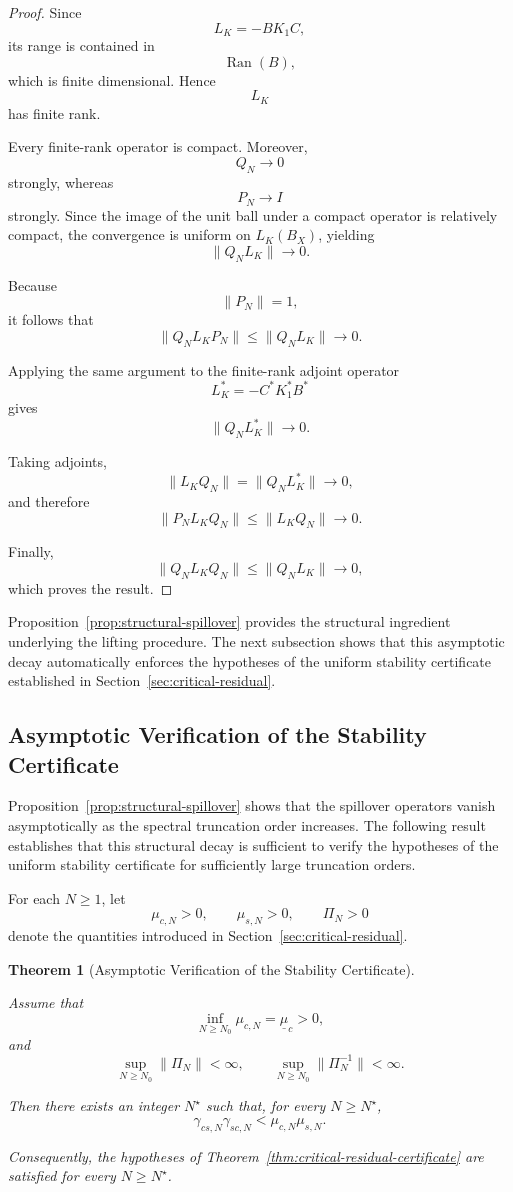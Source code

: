 \documentclass[pdflatex,sn-mathphys-num]{sn-jnl}
\theoremstyle{thmstyleone}%
\newtheorem{theorem}{Theorem}%
\theoremstyle{thmstyletwo}%
\theoremstyle{thmstylethree}%
\begin{document}
\begin{proof}

Since
\[
L_K=-BK_1C,
\]
its range is contained in
\[
\operatorname{Ran}(B),
\]
which is finite dimensional. Hence
\[
L_K
\]
has finite rank.

Every finite-rank operator is compact. Moreover,
\[
Q_N\rightarrow0
\]
strongly, whereas
\[
P_N\rightarrow I
\]
strongly. Since the image of the unit ball under a compact operator is relatively compact, the convergence is uniform on \(L_K(B_X)\), yielding
\[
\|Q_NL_K\|
\longrightarrow0.
\]

Because
\[
\|P_N\|=1,
\]
it follows that
\[
\|Q_NL_KP_N\|
\le
\|Q_NL_K\|
\longrightarrow0.
\]

Applying the same argument to the finite-rank adjoint operator
\[
L_K^*
=
-C^*K_1^*B^*
\]
gives
\[
\|Q_NL_K^*\|
\longrightarrow0.
\]

Taking adjoints,
\[
\|L_KQ_N\|
=
\|Q_NL_K^*\|
\longrightarrow0,
\]
and therefore
\[
\|P_NL_KQ_N\|
\le
\|L_KQ_N\|
\longrightarrow0.
\]

Finally,
\[
\|Q_NL_KQ_N\|
\le
\|Q_NL_K\|
\longrightarrow0,
\]
which proves the result.

\end{proof}

Proposition~\ref{prop:structural-spillover} provides the structural
ingredient underlying the lifting procedure. The next subsection shows that this asymptotic decay automatically enforces the hypotheses of the uniform stability certificate established in
Section~\ref{sec:critical-residual}.

\subsection{Asymptotic Verification of the Stability Certificate}
\label{subsec:automatic-certification}

Proposition~\ref{prop:structural-spillover} shows that the spillover
operators vanish asymptotically as the spectral truncation order increases. The following result establishes that this structural decay is sufficient to verify the hypotheses of the uniform stability certificate for sufficiently large truncation orders.

For each \(N\ge1\), let
\[
\mu_{c,N}>0,
\qquad
\mu_{s,N}>0,
\qquad
\Pi_N>0
\]
denote the quantities introduced in
Section~\ref{sec:critical-residual}.

\begin{theorem}[Asymptotic Verification of the Stability Certificate]
\label{thm:automatic-certification}

Assume that
\[
\inf_{N\ge N_0}\mu_{c,N}
=
\underline{\mu}_c
>
0,
\]
and
\[
\sup_{N\ge N_0}\|\Pi_N\|
<
\infty,
\qquad
\sup_{N\ge N_0}\|\Pi_N^{-1}\|
<
\infty.
\]

Then there exists an integer \(N^\star\) such that, for every
\(N\ge N^\star\),
\[
\gamma_{cs,N}\gamma_{sc,N}
<
\mu_{c,N}\mu_{s,N}.
\]

Consequently, the hypotheses of Theorem~\ref{thm:critical-residual-certificate} are satisfied for every \(N\ge N^\star\).

\end{theorem}
\end{document}
